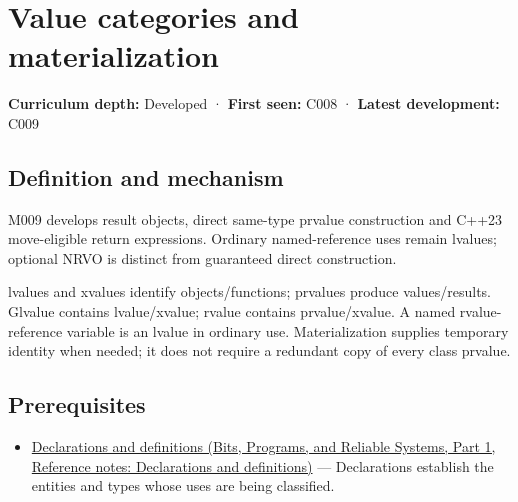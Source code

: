 \hypertarget{appendix-1121b30eaeb0}{}\label{referencestart:appendix-1121b30eaeb0}
\section{Value categories and materialization}\label{appendix-1121b30eaeb0-value-categories-and-materialization}

\hypertarget{appendix-1121b30eaeb0-value-categories-and-materialization}{}

\textbf{Curriculum depth:} Developed · \textbf{First seen:} C008 · \textbf{Latest development:} C009

\begin{allmightroledefinition}

\subsection{Definition and mechanism}\label{appendix-1121b30eaeb0-definition-and-mechanism}

\hypertarget{appendix-1121b30eaeb0-definition-and-mechanism}{}

M009 develops result objects, direct same-type prvalue construction and C++23 move-eligible return expressions. Ordinary named-reference uses remain lvalues; optional NRVO is distinct from guaranteed direct construction.

\end{allmightroledefinition}

lvalues and xvalues identify objects/functions; prvalues produce values/results. Glvalue contains lvalue/xvalue; rvalue contains prvalue/xvalue. A named rvalue-reference variable is an lvalue in ordinary use. Materialization supplies temporary identity when needed; it does not require a redundant copy of every class prvalue.

\subsection{Prerequisites}\label{appendix-1121b30eaeb0-prerequisites}

\hypertarget{appendix-1121b30eaeb0-prerequisites}{}

\begin{itemize}
\tightlist
\item
  \href{../01-Bits-Programs-and-Reliable-Systems-P01/main.pdf\#nameddest=appendix-2e4d494c2d94}{Declarations and definitions (Bits, Programs, and Reliable Systems, Part 1, Reference notes: Declarations and definitions)} --- Declarations establish the entities and types whose uses are being classified.
\end{itemize}

